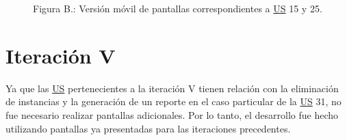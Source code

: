 \documentclass[a4paper, 12pt,twoside]{report}  %
\numberwithin{equation}{subsection} %
\begin{document}
\begin{figure}[H]
	\centering
	\hspace{0.5cm}
	\caption*{Figura B.: Versión móvil de pantallas correspondientes a \hyperlink{US}{US} 15 y 25.}
\end{figure}


\section*{Iteración V}
Ya que las \hyperlink{US}{US} pertenecientes a la iteración V tienen relación con la eliminación de instancias y la generación de un reporte en el caso particular de la \hyperlink{US}{US} 31, no fue necesario realizar pantallas adicionales. Por lo tanto, el desarrollo fue hecho utilizando pantallas ya presentadas para las iteraciones precedentes.
\end{document}
